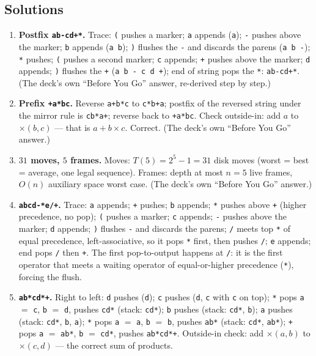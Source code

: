 \documentclass[11pt]{article}
\begin{document}
\subsection*{Solutions}

\begingroup\small
\begin{enumerate}
  \item \textbf{Postfix \texttt{ab-cd+*}.} Trace: \texttt{(} pushes a marker; \texttt{a} appends (\texttt{a}); \texttt{-} pushes above the marker; \texttt{b} appends (\texttt{a b}); \texttt{)} flushes the \texttt{-} and discards the parens (\texttt{a b -}); \texttt{*} pushes; \texttt{(} pushes a second marker; \texttt{c} appends; \texttt{+} pushes above the marker; \texttt{d} appends; \texttt{)} flushes the \texttt{+} (\texttt{a b - c d +}); end of string pops the \texttt{*}: \texttt{ab-cd+*}. (The deck's own ``Before You Go'' answer, re-derived step by step.)
  \item \textbf{Prefix \texttt{+a*bc}.} Reverse \texttt{a+b*c} to \texttt{c*b+a}; postfix of the reversed string under the mirror rule is \texttt{cb*a+}; reverse back to \texttt{+a*bc}. Check outside-in: add $a$ to $\times(b,c)$ --- that is $a + b \times c$. Correct. (The deck's own ``Before You Go'' answer.)
  \item \textbf{$31$ moves, $5$ frames.} Moves: $T(5) = 2^{5} - 1 = 31$ disk moves (worst = best = average, one legal sequence). Frames: depth at most $n = 5$ live frames, $O(n)$ auxiliary space worst case. (The deck's own ``Before You Go'' answer.)
  \item \textbf{\texttt{abcd-*e/+}.} Trace: \texttt{a} appends; \texttt{+} pushes; \texttt{b} appends; \texttt{*} pushes above \texttt{+} (higher precedence, no pop); \texttt{(} pushes a marker; \texttt{c} appends; \texttt{-} pushes above the marker; \texttt{d} appends; \texttt{)} flushes \texttt{-} and discards the parens; \texttt{/} meets top \texttt{*} of equal precedence, left-associative, so it pops \texttt{*} first, then pushes \texttt{/}; \texttt{e} appends; end pops \texttt{/} then \texttt{+}. The first pop-to-output happens at \texttt{/}: it is the first operator that meets a waiting operator of equal-or-higher precedence (\texttt{*}), forcing the flush.
  \item \textbf{\texttt{ab*cd*+}.} Right to left: \texttt{d} pushes (\texttt{d}); \texttt{c} pushes (\texttt{d}, \texttt{c} with \texttt{c} on top); \texttt{*} pops \texttt{a} $=$ \texttt{c}, \texttt{b} $=$ \texttt{d}, pushes \texttt{cd*} (stack: \texttt{cd*}); \texttt{b} pushes (stack: \texttt{cd*}, \texttt{b}); \texttt{a} pushes (stack: \texttt{cd*}, \texttt{b}, \texttt{a}); \texttt{*} pops \texttt{a} $=$ \texttt{a}, \texttt{b} $=$ \texttt{b}, pushes \texttt{ab*} (stack: \texttt{cd*}, \texttt{ab*}); \texttt{+} pops \texttt{a} $=$ \texttt{ab*}, \texttt{b} $=$ \texttt{cd*}, pushes \texttt{ab*cd*+}. Outside-in check: add $\times(a,b)$ to $\times(c,d)$ --- the correct sum of products.
\end{enumerate}
\endgroup



\end{document}
